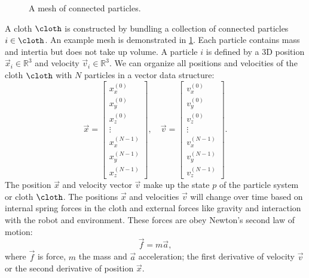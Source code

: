 \documentclass[\home/main.tex]{subfiles}
\begin{document}
\begin{figure}[htb]
    
    \label{fig:mesh_particles}
    \caption[Mesh of particles]{A mesh of connected particles.}
\end{figure}

A cloth $\cloth$ is constructed by bundling a collection of connected particles $i \in \cloth$. An example mesh is demonstrated in \cref{fig:mesh_particles}. Each particle contains mass and intertia but does not take up volume. A particle $i$ is defined by a 3D position $\vec{x}_i \in \mathbb{R}^3$ and velocity $\vec{v}_i \in \mathbb{R}^3$. We can organize all positions and velocities of the cloth $\cloth$ with $N$ particles in a vector data structure:
\begin{equation}
    \vec{x}=\left[\begin{array}{c}
    x^{(0)}_{x} \\
    x^{(0)}_{y} \\
    x^{(0)}_{z} \\
    \vdots \\
    x^{(N-1)}_{x} \\
    x^{(N-1)}_{y} \\
    x^{(N-1)}_{z}

    \end{array}
\right], \quad \vec{v}=\left[\begin{array}{c}
    v^{(0)}_{x} \\
    v^{(0)}_{y} \\
    v^{(0)}_{z} \\
    \vdots \\
    v^{(N-1)}_{x} \\
    v^{(N-1)}_{y} \\
    v^{(N-1)}_{z}
    \end{array}\right].
\end{equation}
The position $\vec{x}$ and velocity vector $\vec{v}$ make up the state $p$ of the particle system or cloth $\cloth$. The positions $\vec{x}$ and velocities $\vec{v}$ will change over time based on internal spring forces in the cloth and external forces like gravity and interaction with the robot and environment. These forces are obey Newton's second law of motion:
\begin{equation}\label{eq:newton_second_law}
    \vec{f} = m\vec{a},
\end{equation}
where $\vec{f}$ is force, $m$ the mass and $\vec{a}$ acceleration; the first derivative of velocity $\vec{v}$ or the second derivative of position $\vec{x}$. 
\end{document}
